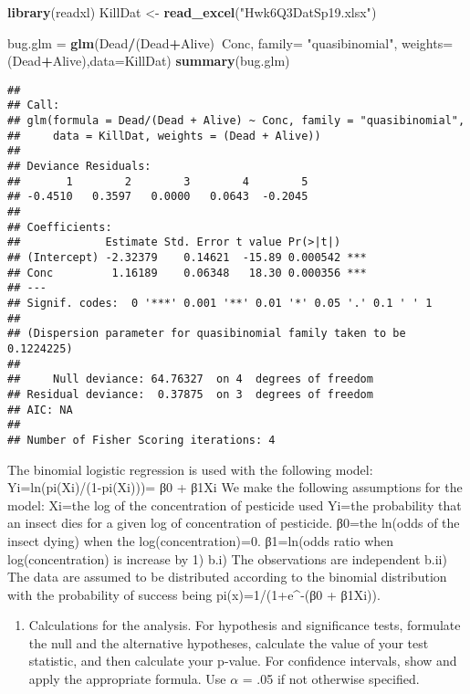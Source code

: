 \documentclass[]{article}
\newenvironment{Shaded}{\begin{snugshade}}{\end{snugshade}}
\newcommand{\KeywordTok}[1]{\textcolor[rgb]{0.13,0.29,0.53}{\textbf{#1}}}
\newcommand{\DataTypeTok}[1]{\textcolor[rgb]{0.13,0.29,0.53}{#1}}
\newcommand{\StringTok}[1]{\textcolor[rgb]{0.31,0.60,0.02}{#1}}
\newcommand{\OperatorTok}[1]{\textcolor[rgb]{0.81,0.36,0.00}{\textbf{#1}}}
\newcommand{\NormalTok}[1]{#1}
\providecommand{\tightlist}{%
  \setlength{\itemsep}{0pt}\setlength{\parskip}{0pt}}
\begin{document}
\begin{Shaded}
\begin{Highlighting}[]
\KeywordTok{library}\NormalTok{(readxl)}
\NormalTok{KillDat <-}\StringTok{ }\KeywordTok{read_excel}\NormalTok{(}\StringTok{"Hwk6Q3DatSp19.xlsx"}\NormalTok{)}


\NormalTok{bug.glm =}\StringTok{ }\KeywordTok{glm}\NormalTok{(Dead}\OperatorTok{/}\NormalTok{(Dead}\OperatorTok{+}\NormalTok{Alive)}\OperatorTok{~}\NormalTok{Conc, }\DataTypeTok{family=} \StringTok{"quasibinomial"}\NormalTok{, }\DataTypeTok{weights=}\NormalTok{(Dead}\OperatorTok{+}\NormalTok{Alive),}\DataTypeTok{data=}\NormalTok{KillDat)}
\KeywordTok{summary}\NormalTok{(bug.glm)}
\end{Highlighting}
\end{Shaded}

\begin{verbatim}
## 
## Call:
## glm(formula = Dead/(Dead + Alive) ~ Conc, family = "quasibinomial", 
##     data = KillDat, weights = (Dead + Alive))
## 
## Deviance Residuals: 
##       1        2        3        4        5  
## -0.4510   0.3597   0.0000   0.0643  -0.2045  
## 
## Coefficients:
##             Estimate Std. Error t value Pr(>|t|)    
## (Intercept) -2.32379    0.14621  -15.89 0.000542 ***
## Conc         1.16189    0.06348   18.30 0.000356 ***
## ---
## Signif. codes:  0 '***' 0.001 '**' 0.01 '*' 0.05 '.' 0.1 ' ' 1
## 
## (Dispersion parameter for quasibinomial family taken to be 0.1224225)
## 
##     Null deviance: 64.76327  on 4  degrees of freedom
## Residual deviance:  0.37875  on 3  degrees of freedom
## AIC: NA
## 
## Number of Fisher Scoring iterations: 4
\end{verbatim}

The binomial logistic regression is used with the following model:
Yi=ln(pi(Xi)/(1-pi(Xi)))= β0 + β1Xi We make the following assumptions
for the model: Xi=the log of the concentration of pesticide used Yi=the
probability that an insect dies for a given log of concentration of
pesticide. β0=the ln(odds of the insect dying) when the
log(concentration)=0. β1=ln(odds ratio when log(concentration) is
increase by 1) b.i) The observations are independent b.ii) The data are
assumed to be distributed according to the binomial distribution with
the probability of success being pi(x)=1/(1+e\^{}-(β0 + β1Xi)).

\begin{enumerate}
\def\labelenumi{\Alph{enumi})}
\setcounter{enumi}{2}
\tightlist
\item
  Calculations for the analysis. For hypothesis and significance tests,
  formulate the null and the alternative hypotheses, calculate the value
  of your test statistic, and then calculate your p-value. For
  confidence intervals, show and apply the appropriate formula. Use
  \(\alpha\) = .05 if not otherwise specified.
\end{enumerate}
\end{document}
